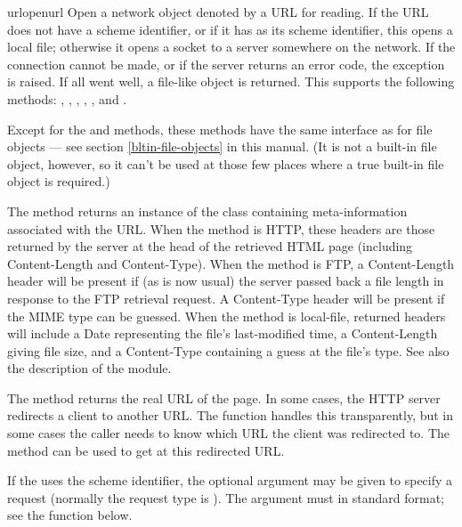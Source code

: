 \begin{funcdesc}{urlopen}{url}
Open a network object denoted by a URL for reading.  If the URL does
not have a scheme identifier, or if it has  as its scheme
identifier, this opens a local file; otherwise it opens a socket to a
server somewhere on the network.  If the connection cannot be made, or
if the server returns an error code, the  exception
is raised.  If all went well, a file-like object is returned.  This
supports the following methods: , ,
, , ,
 and .

Except for the  and  methods,
these methods have the same interface as for
file objects --- see section \ref{bltin-file-objects} in this
manual.  (It is not a built-in file object, however, so it can't be
used at those few places where a true built-in file object is
required.)

The  method returns an instance of the class
 containing meta-information associated
with the URL.  When the method is HTTP, these headers are those
returned by the server at the head of the retrieved HTML page
(including Content-Length and Content-Type).  When the method is FTP,
a Content-Length header will be present if (as is now usual) the
server passed back a file length in response to the FTP retrieval
request. A Content-Type header will be present if the MIME type can
be guessed.  When the method is local-file, returned headers will include
a Date representing the file's last-modified time, a Content-Length
giving file size, and a Content-Type containing a guess at the file's
type. See also the description of the
 module.

The  method returns the real URL of the page.  In
some cases, the HTTP server redirects a client to another URL.  The
 function handles this transparently, but in some
cases the caller needs to know which URL the client was redirected
to.  The  method can be used to get at this
redirected URL.

If the  uses the  scheme identifier, the optional
 argument may be given to specify a  request
(normally the request type is ).  The  argument
must in standard  format;
see the  function below.


\end{funcdesc}
